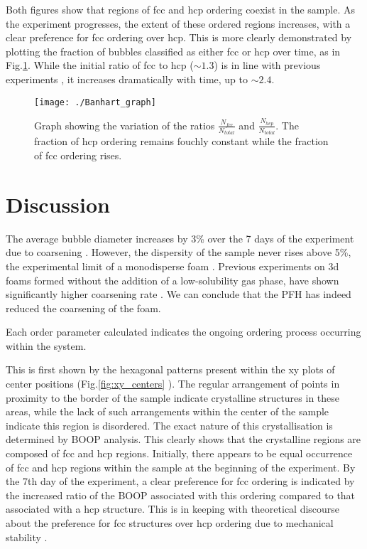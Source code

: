 \documentclass[10pt,a4paper]{article}
\begin{document}
Both figures show that regions of fcc and hcp ordering coexist in the sample. As the experiment progresses, the extent of these ordered regions increases, with a clear preference for fcc ordering over hcp. This is more clearly demonstrated by plotting the fraction of bubbles classified as either fcc or hcp
over time, as in Fig.\ref{fig:Banhart_graph}. While the initial ratio of fcc to hcp ($\sim 1.3$) is in line with previous experiments \cite{VanderNet06,vanderNetEtal07}, it increases dramatically with time, up to $\sim 2.4$.

\begin{figure}[H]
\centering
\texttt{[image: ./Banhart\_graph]}
\caption{Graph showing the variation of the ratios $\frac{N_{fcc}}{N_{total}}$ and $\frac{N_{hcp}}{N_{total}}$. The fraction of hcp ordering remains fouchly constant while the fraction of fcc ordering rises.}
\label{fig:Banhart_graph}
\end{figure}

\section{Discussion}

The average bubble diameter increases by 3\% over the 7 days of the experiment due to coarsening \cite{stevenson2012foam}. However, the dispersity of the sample never rises above 5\%, the experimental limit of a monodisperse foam \cite{HohlerEtal08}. Previous experiments on 3d foams formed without the addition of a low-solubility gas phase, have shown significantly higher coarsening rate \cite{Gonatas1995}. We can conclude that the PFH has indeed reduced the coarsening of the foam.

Each order parameter calculated indicates the ongoing ordering process occurring within the system. 

This is first shown by the hexagonal patterns present within the xy plots of center positions (Fig.\ref{fig:xy_centers} ). The regular arrangement of points in proximity to the border of the sample indicate crystalline structures in these areas, while the lack of such arrangements within the center of the sample indicate this region is disordered. The exact nature of this crystallisation is determined by BOOP analysis. This clearly shows that the crystalline regions are composed of fcc and hcp regions. Initially, there appears to be equal occurrence of fcc and hcp regions within the sample at the beginning of the experiment. By the 7th day of the experiment, a clear preference for fcc ordering is indicated by the increased ratio of the BOOP associated with this ordering compared to that associated with a hcp structure. This is in keeping with theoretical discourse about the preference for fcc structures over hcp ordering due to mechanical stability \cite{Heitkam2012}. 
\end{document}

